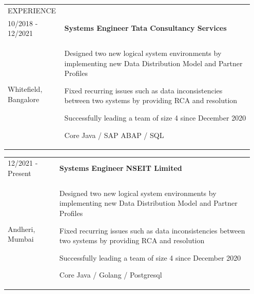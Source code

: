 \documentclass{letter}
\begin{document}
\vspace{15pt}
\begin{tabular}{p{0.2\linewidth} p{0.75\linewidth}}
  \normalsize\colorbox{black!100}{\textcolor{white!90}{EXPERIENCE}} \\[1ex] 
  10/2018 - 12/2021 & \normalsize\textbf{Systems Engineer} \hfill \footnotesize\textbf{Tata Consultancy Services} \\
  \small Whitefield, Bangalore &  
  \raggedright{Designed two new logical system environments by implementing new Data Distribution Model and Partner Profiles} 
  \newline
  \raggedright{Fixed recurring issues such as data inconsistencies between two systems by providing RCA and resolution} 
  \newline
  \raggedright{Successfully leading a team of size 4 since December 2020}
  \newline
  \raggedright{\ttfamily Core Java / SAP ABAP / SQL} \\
\end{tabular}

\begin{tabular}{p{0.2\linewidth} p{0.75\linewidth}}
  12/2021 - Present & \normalsize\textbf{Systems Engineer} \hfill \footnotesize\textbf{NSEIT Limited} \\
  \small Andheri, Mumbai & 
  \raggedright{Designed two new logical system environments by implementing new Data Distribution Model and Partner Profiles} 
  \newline
  \raggedright{Fixed recurring issues such as data inconsistencies between two systems by providing RCA and resolution} 
  \newline
  \raggedright{Successfully leading a team of size 4 since December 2020} 
  \newline
  \raggedright{\ttfamily Core Java / Golang / Postgresql} \\
\end{tabular}
\end{document}
